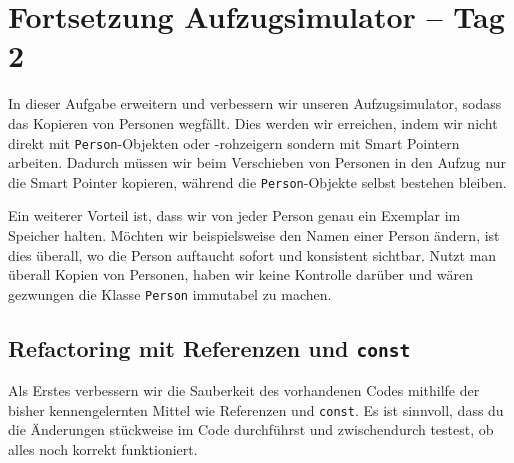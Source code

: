 \section{Fortsetzung Aufzugsimulator -- Tag 2}
In dieser Aufgabe erweitern und verbessern wir unseren Aufzugsimulator, sodass das Kopieren von Personen wegfällt.
Dies werden wir erreichen, indem wir nicht direkt mit \lstinline{Person}-Objekten oder -rohzeigern sondern mit Smart Pointern arbeiten.
Dadurch müssen wir beim Verschieben von Personen in den Aufzug nur die Smart Pointer kopieren, während die \lstinline{Person}-Objekte selbst bestehen bleiben.

Ein weiterer Vorteil ist, dass wir von jeder Person genau ein Exemplar im Speicher halten.
Möchten wir beispielsweise den Namen einer Person ändern, ist dies überall, wo die Person auftaucht sofort und konsistent sichtbar.
Nutzt man überall Kopien von Personen, haben wir keine Kontrolle darüber und wären gezwungen die Klasse \lstinline{Person} immutabel zu machen. \\


\subsection{Refactoring mit Referenzen und \lstinline{const}}
Als Erstes verbessern wir die Sauberkeit des vorhandenen Codes mithilfe der bisher kennengelernten Mittel wie Referenzen und \lstinline{const}.
Es ist sinnvoll, dass du die Änderungen stückweise im Code durchführst und zwischendurch testest, ob alles noch korrekt funktioniert.

